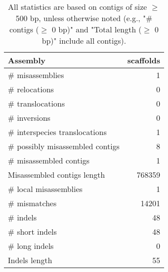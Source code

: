 \documentclass[12pt,a4paper]{article}
\begin{document}
\begin{table}[ht]
\begin{center}
\caption{All statistics are based on contigs of size $\geq$ 500 bp, unless otherwise noted (e.g., "\# contigs ($\geq$ 0 bp)" and "Total length ($\geq$ 0 bp)" include all contigs).}
\begin{tabular}{|l*{1}{|r}|}
\hline
Assembly & scaffolds \\ \hline
\# misassemblies & 1 \\ \hline
\hspace{5mm}\# relocations & 0 \\ \hline
\hspace{5mm}\# translocations & 0 \\ \hline
\hspace{5mm}\# inversions & 0 \\ \hline
\hspace{5mm}\# interspecies translocations & 1 \\ \hline
\# possibly misassembled contigs & 8 \\ \hline
\# misassembled contigs & 1 \\ \hline
Misassembled contigs length & 768359 \\ \hline
\# local misassemblies & 1 \\ \hline
\# mismatches & 14201 \\ \hline
\# indels & 48 \\ \hline
\hspace{5mm}\# short indels & 48 \\ \hline
\hspace{5mm}\# long indels & 0 \\ \hline
Indels length & 55 \\ \hline
\end{tabular}
\end{center}
\end{table}
\end{document}
